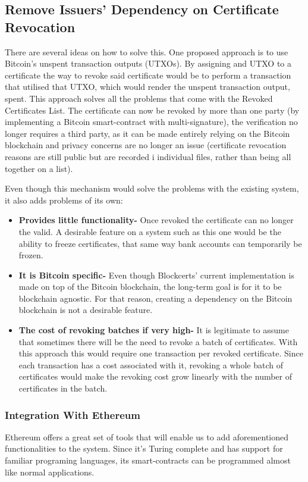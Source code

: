 \documentclass[llncsdoc]{llncs}
\begin{document}
\subsection{Remove Issuers' Dependency on Certificate Revocation}
There are several ideas on how to solve this. One proposed approach is to use Bitcoin's unspent transaction outputs (UTXOs). By assigning and UTXO to a certificate the way to revoke said certificate would be to perform a transaction that utilised that UTXO, which would render the unspent transaction output, spent. This approach solves all the problems that come with the Revoked Certificates List. The certificate can now be revoked by more than one party (by implementing a Bitcoin smart-contract with multi-signature), the verification no longer requires a third party, as it can be made entirely relying on the Bitcoin blockchain and privacy concerns are no longer an issue (certificate revocation reasons are still public but are recorded i individual files, rather than being all together on a list).

Even though this mechanism would solve the problems with the existing system, it also adds problems of its own:
\begin{itemize}
    \item \textbf{Provides little functionality-} Once revoked the certificate can no longer the valid. A desirable feature on a system such as this one would be the ability to freeze certificates, that same way bank accounts can temporarily be frozen.
    \item \textbf{It is Bitcoin specific-} Even though Blockcerts' current implementation is made on top of the Bitcoin blockchain, the long-term goal is for it to be blockchain agnostic. For that reason, creating a dependency on the Bitcoin blockchain is not a desirable feature.
    \item \textbf{The cost of revoking batches if very high-} It is legitimate to assume that sometimes there will be the need to revoke a batch of certificates. With this approach this would require one transaction per revoked certificate. Since each transaction has a cost associated with it, revoking a whole batch of certificates would make the revoking cost grow linearly with the number of certificates in the batch.
\end{itemize}

\subsubsection{Integration With Ethereum}
Ethereum offers a great set of tools that will enable us to add aforementioned functionalities to the system. Since it's Turing complete and has support for familiar programing languages, its smart-contracts can be programmed almost like normal applications.
\end{document}
